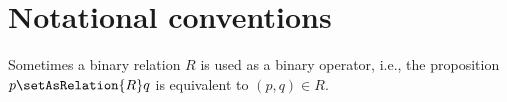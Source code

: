 \section{Notational conventions}

Sometimes a binary relation $R$ is used as a binary
operator, i.e., the proposition $p \setAsRelation{R} q$ is equivalent to $(p, q) \in R$.
